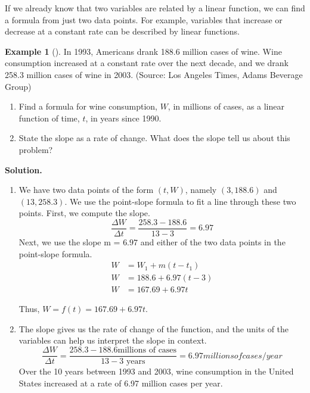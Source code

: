 \documentclass[10pt,]{book}
\theoremstyle{plain}
\theoremstyle{definition}
\theoremstyle{definition}
\theoremstyle{definition}
\newtheorem{example}[theorem]{Example}
\theoremstyle{definition}
\theoremstyle{definition}
\numberwithin{equation}{section}
\newcommand{\amp}{ & }
\begin{document}
    If we already know that two variables are related by a linear function, we can find a formula from just two data points. For example, variables that increase or decrease at a constant rate can be described by linear functions.
%
\begin{example}[]\label{example-wine}
In 1993, Americans drank 188.6 million cases of wine. Wine consumption increased at a constant rate over the next decade, and we drank 258.3 million cases of wine in 2003. (Source: Los Angeles Times, Adams Beverage Group)%
\leavevmode%
\begin{enumerate}[label=*\alph**]
\item\hypertarget{li-179}{}Find a formula for wine consumption, \(W\), in millions of cases, as a linear function of time, \(t\), in years since 1990.\item\hypertarget{li-180}{}State the slope as a rate of change. What does the slope tell us about this problem?\end{enumerate}
\par\medskip\noindent%
\textbf{Solution.}\quad \leavevmode%
\begin{enumerate}[label=*\alph**]
\item\hypertarget{li-181}{}We have two data points of the form \((t, W)\), namely \((3, 188.6)\) and \((13, 258.3)\). We use the point-slope formula to fit a line through these two points. First, we compute the slope.
        \begin{equation*}\frac{\Delta W}{\Delta t}=\frac {258.3 − 188.6}{13 − 3}= 6.97\end{equation*}
        Next, we use the slope m = \(6.97\) and either of the two data points in the point-slope formula.
        \begin{align*}
            W \amp =W_1 + m(t − t_1) \\
            W \amp = 188.6 + 6.97(t − 3) \\
            W \amp = 167.69 + 6.97t
        \end{align*}

        Thus, \(W = f (t) = 167.69 + 6.97t\).
        \item\hypertarget{li-182}{}The slope gives us the rate of change of the function, and the units of the variables can help us interpret the slope in context.
        \begin{equation*}\frac{\Delta W}{\Delta t}= 
            \frac{258.3 − 188.6 \text{millions of cases}}{13 − 3\text{ years}}
                = 6.97 millions of cases /year
        \end{equation*}
        Over the 10 years between 1993 and 2003, wine consumption in the United States increased at a rate of 6.97 million cases per year.\end{enumerate}
\end{example}
\end{document}
